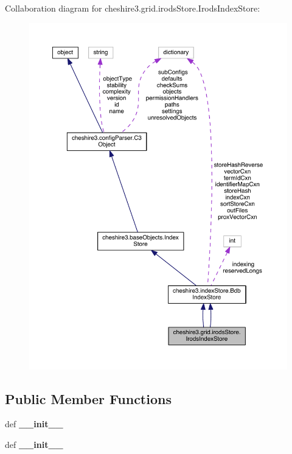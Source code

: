 Collaboration diagram for cheshire3.\-grid.\-irods\-Store.\-Irods\-Index\-Store\-:
\nopagebreak
\begin{figure}[H]
\begin{center}
\leavevmode
\includegraphics[width=350pt]{classcheshire3_1_1grid_1_1irods_store_1_1_irods_index_store__coll__graph}
\end{center}
\end{figure}
\subsection*{Public Member Functions}
\begin{DoxyCompactItemize}
\item 
\hypertarget{classcheshire3_1_1grid_1_1irods_store_1_1_irods_index_store_a8467c87bc4ccd2126b7740526dee8e1c}{def {\bfseries \-\_\-\-\_\-init\-\_\-\-\_\-}}\label{classcheshire3_1_1grid_1_1irods_store_1_1_irods_index_store_a8467c87bc4ccd2126b7740526dee8e1c}

\item 
\hypertarget{classcheshire3_1_1grid_1_1irods_store_1_1_irods_index_store_a8467c87bc4ccd2126b7740526dee8e1c}{def {\bfseries \-\_\-\-\_\-init\-\_\-\-\_\-}}\label{classcheshire3_1_1grid_1_1irods_store_1_1_irods_index_store_a8467c87bc4ccd2126b7740526dee8e1c}

\end{DoxyCompactItemize}
